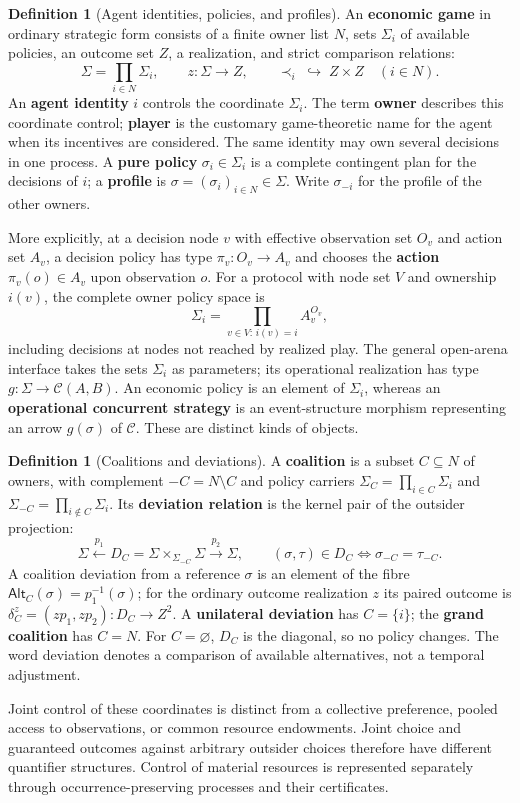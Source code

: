\documentclass[11pt,a4paper]{article}
\numberwithin{equation}{section}
\theoremstyle{definition}
\newtheorem{definition}[theorem]{Definition}
\theoremstyle{remark}
\theoremstyle{plain}
\begin{document}
\begin{definition}[Agent identities, policies, and profiles]
\label{def:egt-economic-policy}
An \textbf{economic game} in ordinary strategic form consists of a finite
owner list $N$, sets $\Sigma_i$ of available policies, an outcome set $Z$,
a realization, and strict comparison relations:
\[
 \Sigma=\prod_{i\in N}\Sigma_i,\qquad
 z:\Sigma\longrightarrow Z,\qquad
 \prec_i\;\hookrightarrow\;Z\times Z\quad(i\in N).
\]
An \textbf{agent identity} $i$ controls the coordinate $\Sigma_i$.
The term \textbf{owner} describes this coordinate control; \textbf{player}
is the customary game-theoretic name for the agent when its incentives are
considered. The same identity may own several decisions in one process.
A \textbf{pure policy} $\sigma_i\in\Sigma_i$ is a complete contingent plan
for the decisions of $i$; a \textbf{profile} is
$\sigma=(\sigma_i)_{i\in N}\in\Sigma$. Write $\sigma_{-i}$ for the
profile of the other owners.

More explicitly, at a decision node $v$ with effective observation set
$O_v$ and action set $A_v$, a decision policy has type
$\pi_v:O_v\to A_v$ and chooses the \textbf{action}
$\pi_v(o)\in A_v$ upon observation $o$. For a protocol with node set
$V$ and ownership $i(v)$, the complete owner policy space is
\[
 \Sigma_i=\prod_{v\in V:\,i(v)=i}A_v^{O_v},
\]
including decisions at nodes not reached by realized play. The general
open-arena interface takes the sets $\Sigma_i$ as parameters; its
operational realization has type $g:\Sigma\to\mathcal C(A,B)$.
An economic policy is an element of $\Sigma_i$, whereas an
\textbf{operational concurrent strategy} is an event-structure morphism
representing an arrow $g(\sigma)$ of $\mathcal C$. These are distinct
kinds of objects.
\end{definition}
\begin{definition}[Coalitions and deviations]
\label{def:egt-economic-coalition}
A \textbf{coalition} is a subset $C\subseteq N$ of owners, with
complement $-C=N\setminus C$ and policy carriers
$\Sigma_C=\prod_{i\in C}\Sigma_i$ and
$\Sigma_{-C}=\prod_{i\notin C}\Sigma_i$. Its \textbf{deviation relation}
is the kernel pair of the outsider projection:
\[
 \Sigma\xleftarrow{p_1}
 D_C=\Sigma\times_{\Sigma_{-C}}\Sigma
 \xrightarrow{p_2}\Sigma,\qquad
 (\sigma,\tau)\in D_C\iff\sigma_{-C}=\tau_{-C}.
\]
A coalition deviation from a reference $\sigma$ is an element of the
fibre $\mathsf{Alt}_C(\sigma)=p_1^{-1}(\sigma)$; for the ordinary outcome
realization $z$ its paired outcome is
$\delta_C^z=(zp_1,zp_2):D_C\to Z^2$.
A \textbf{unilateral deviation} has $C=\{i\}$; the
\textbf{grand coalition} has $C=N$. For $C=\varnothing$, $D_C$ is the
diagonal, so no policy changes. The word deviation denotes a comparison
of available alternatives, not a temporal adjustment.

Joint control of these coordinates is distinct from a collective
preference, pooled access to observations, or common resource endowments.
Joint choice and guaranteed outcomes against arbitrary outsider choices
therefore have different quantifier structures. Control of material resources is represented separately through
occurrence-preserving processes and their certificates.
\end{definition}
\end{document}
